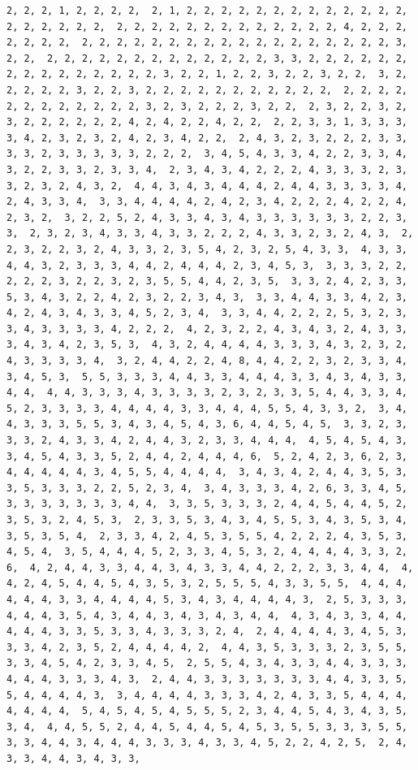 \documentclass[
]{article}
\begin{document}
\begin{verbatim}
2, 2, 2, 1, 2, 2, 2, 2,  2, 1, 2, 2, 2, 2, 2, 2, 2, 2, 2, 2, 2, 2, 2, 2, 2, 2, 2, 2, 2,  2, 2, 2, 2, 2, 2, 2, 2, 2, 2, 2, 2, 2, 4, 2, 2, 2, 2, 2, 2, 2,  2, 2, 2, 2, 2, 2, 2, 2, 2, 2, 2, 2, 2, 2, 2, 2, 2, 2, 3, 2, 2,  2, 2, 2, 2, 2, 2, 2, 2, 2, 2, 2, 2, 2, 3, 3, 2, 2, 2, 2, 2, 2,  2, 2, 2, 2, 2, 2, 2, 2, 2, 3, 2, 2, 1, 2, 2, 3, 2, 2, 3, 2, 2,  3, 2, 2, 2, 2, 2, 3, 2, 2, 3, 2, 2, 2, 2, 2, 2, 2, 2, 2, 2, 2,  2, 2, 2, 2, 2, 2, 2, 2, 2, 2, 2, 2, 3, 2, 3, 2, 2, 2, 3, 2, 2,  2, 3, 2, 2, 3, 2, 3, 2, 2, 2, 2, 2, 2, 4, 2, 4, 2, 2, 4, 2, 2,  2, 2, 3, 3, 1, 3, 3, 3, 3, 4, 2, 3, 2, 3, 2, 4, 2, 3, 4, 2, 2,  2, 4, 3, 2, 3, 2, 2, 2, 3, 3, 3, 3, 2, 3, 3, 3, 3, 3, 2, 2, 2,  3, 4, 5, 4, 3, 3, 4, 2, 2, 3, 3, 4, 3, 2, 2, 3, 3, 2, 3, 3, 4,  2, 3, 4, 3, 4, 2, 2, 2, 4, 3, 3, 3, 2, 3, 3, 2, 3, 2, 4, 3, 2,  4, 4, 3, 4, 3, 4, 4, 4, 2, 4, 4, 3, 3, 3, 3, 4, 2, 4, 3, 3, 4,  3, 3, 4, 4, 4, 4, 2, 4, 2, 3, 4, 2, 2, 2, 4, 2, 2, 4, 2, 3, 2,  3, 2, 2, 5, 2, 4, 3, 3, 4, 3, 4, 3, 3, 3, 3, 3, 3, 2, 2, 3, 3,  2, 3, 2, 3, 4, 3, 3, 4, 3, 3, 2, 2, 2, 4, 3, 3, 2, 3, 2, 4, 3,  2, 2, 3, 2, 2, 3, 2, 4, 3, 3, 2, 3, 5, 4, 2, 3, 2, 5, 4, 3, 3,  4, 3, 3, 4, 4, 3, 2, 3, 3, 3, 4, 4, 2, 4, 4, 4, 2, 3, 4, 5, 3,  3, 3, 3, 2, 2, 2, 2, 2, 3, 2, 2, 3, 2, 3, 5, 5, 4, 4, 2, 3, 5,  3, 3, 2, 4, 2, 3, 3, 5, 3, 4, 3, 2, 2, 4, 2, 3, 2, 2, 3, 4, 3,  3, 3, 4, 4, 3, 3, 4, 2, 3, 4, 2, 4, 3, 4, 3, 3, 4, 5, 2, 3, 4,  3, 3, 4, 4, 2, 2, 2, 5, 3, 2, 3, 3, 4, 3, 3, 3, 3, 4, 2, 2, 2,  4, 2, 3, 2, 2, 4, 3, 4, 3, 2, 4, 3, 3, 3, 4, 3, 4, 2, 3, 5, 3,  4, 3, 2, 4, 4, 4, 4, 3, 3, 3, 4, 3, 2, 3, 2, 4, 3, 3, 3, 3, 4,  3, 2, 4, 4, 2, 2, 4, 8, 4, 4, 2, 2, 3, 2, 3, 3, 4, 3, 4, 5, 3,  5, 5, 3, 3, 3, 4, 4, 3, 3, 4, 4, 4, 3, 3, 4, 3, 4, 3, 3, 4, 4,  4, 4, 3, 3, 3, 4, 3, 3, 3, 3, 2, 3, 2, 3, 3, 5, 4, 4, 3, 3, 4,  5, 2, 3, 3, 3, 3, 4, 4, 4, 4, 3, 3, 4, 4, 4, 5, 5, 4, 3, 3, 2,  3, 4, 4, 3, 3, 3, 5, 5, 3, 4, 3, 4, 5, 4, 3, 6, 4, 4, 5, 4, 5,  3, 3, 2, 3, 3, 3, 2, 4, 3, 3, 4, 2, 4, 4, 3, 2, 3, 3, 4, 4, 4,  4, 5, 4, 5, 4, 3, 3, 4, 5, 4, 3, 3, 5, 2, 4, 4, 2, 4, 4, 4, 6,  5, 2, 4, 2, 3, 6, 2, 3, 4, 4, 4, 4, 4, 3, 4, 5, 5, 4, 4, 4, 4,  3, 4, 3, 4, 2, 4, 4, 3, 5, 3, 3, 5, 3, 3, 3, 2, 2, 5, 2, 3, 4,  3, 4, 3, 3, 3, 4, 2, 6, 3, 3, 4, 5, 3, 3, 3, 3, 3, 3, 3, 4, 4,  3, 3, 5, 3, 3, 3, 2, 4, 4, 5, 4, 4, 5, 2, 3, 5, 3, 2, 4, 5, 3,  2, 3, 3, 5, 3, 4, 3, 4, 5, 5, 3, 4, 3, 5, 3, 4, 3, 5, 3, 5, 4,  2, 3, 3, 4, 2, 4, 5, 3, 5, 5, 4, 2, 2, 2, 4, 3, 5, 3, 4, 5, 4,  3, 5, 4, 4, 4, 5, 2, 3, 3, 4, 5, 3, 2, 4, 4, 4, 4, 3, 3, 2, 6,  4, 2, 4, 4, 3, 3, 4, 4, 3, 4, 3, 3, 4, 4, 2, 2, 2, 3, 3, 4, 4,  4, 4, 2, 4, 5, 4, 4, 5, 4, 3, 5, 3, 2, 5, 5, 5, 4, 3, 3, 5, 5,  4, 4, 4, 4, 4, 4, 3, 3, 4, 4, 4, 4, 5, 3, 4, 3, 4, 4, 4, 4, 3,  2, 5, 3, 3, 3, 4, 4, 4, 3, 5, 4, 3, 4, 4, 3, 4, 3, 4, 3, 4, 4,  4, 3, 4, 3, 3, 4, 4, 4, 4, 4, 3, 3, 5, 3, 3, 4, 3, 3, 3, 2, 4,  2, 4, 4, 4, 4, 3, 4, 5, 3, 3, 3, 4, 2, 3, 5, 2, 4, 4, 4, 4, 2,  4, 4, 3, 5, 3, 3, 3, 2, 3, 5, 5, 3, 3, 4, 5, 4, 2, 3, 3, 4, 5,  2, 5, 5, 4, 3, 4, 3, 3, 4, 4, 3, 3, 3, 4, 4, 4, 3, 3, 3, 4, 3,  2, 4, 4, 3, 3, 3, 3, 3, 3, 3, 4, 4, 3, 3, 5, 5, 4, 4, 4, 4, 3,  3, 4, 4, 4, 4, 3, 3, 3, 4, 2, 4, 3, 3, 5, 4, 4, 4, 4, 4, 4, 4,  5, 4, 5, 4, 5, 4, 5, 5, 5, 2, 3, 4, 4, 5, 4, 3, 4, 3, 5, 3, 4,  4, 4, 5, 5, 2, 4, 4, 5, 4, 4, 5, 4, 5, 3, 5, 5, 3, 3, 3, 5, 5,  3, 3, 4, 4, 3, 4, 4, 4, 3, 3, 3, 4, 3, 3, 4, 5, 2, 2, 4, 2, 5,  2, 4, 3, 3, 4, 4, 3, 4, 3, 3, 
\end{verbatim}
\end{document}
